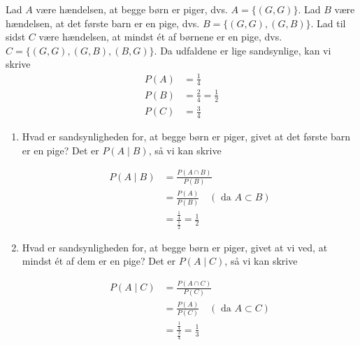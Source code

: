\begin{solution}
    Lad $A$ være hændelsen, at begge børn er piger, dvs. $A=\{(G, G)\}$. Lad $B$ være hændelsen, at det første barn er en pige, dvs. $B=\{(G, G),(G, B)\}$. Lad til sidst $C$ være hændelsen, at mindst ét af børnene er en pige, dvs. $C=\{(G, G),(G, B),(B, G)\}$. Da udfaldene er lige sandsynlige, kan vi skrive
    \begin{align*}
    P(A) &= \frac{1}{4} \\
    P(B) &= \frac{2}{4} = \frac{1}{2} \\
    P(C) &= \frac{3}{4}
    \end{align*}


    \begin{enumerate}[label=(\alph*)]
         \item Hvad er sandsynligheden for, at begge børn er piger, givet at det første barn er en pige? Det er $P(A \mid B)$, så vi kan skrive

                    \begin{align*}
                    P(A \mid B) & =\frac{P(A \cap B)}{P(B)} \\
                    & =\frac{P(A)}{P(B)} \quad(\text { da } A \subset B) \\
                    & =\frac{\frac{1}{4}}{\frac{1}{2}}=\frac{1}{2}
                    \end{align*}
                
                \item Hvad er sandsynligheden for, at begge børn er piger, givet at vi ved, at mindst ét af dem er en pige? Det er $P(A \mid C)$, så vi kan skrive

                    \begin{align*}
                    P(A \mid C) & =\frac{P(A \cap C)}{P(C)} \\
                    & =\frac{P(A)}{P(C)} \quad(\text { da } A \subset C) \\
                    & =\frac{\frac{1}{4}}{\frac{3}{4}}=\frac{1}{3}
                    \end{align*}
        
    \end{enumerate}
\end{solution}

